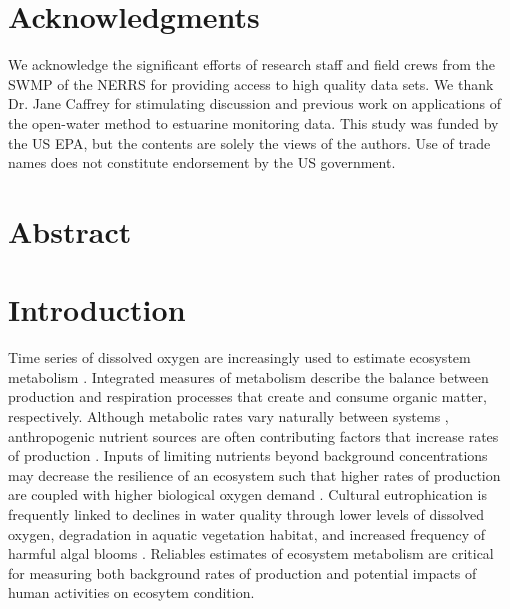 \documentclass[letterpaper,12pt,oneside]{article}\usepackage[]{graphicx}\usepackage[]{color}
\begin{document}
\raggedbottom
\linenumbers
\raggedright
{}
\setlength{\parindent}{0.5in}
\renewcommand\refname{References \vspace{12pt}}



\section{Acknowledgments}

We acknowledge the significant efforts of research staff and field crews from the \acl{SWMP} of the \acl{NERRS} for providing access to high quality data sets.  We thank Dr. Jane Caffrey for stimulating discussion and previous work on applications of the open-water method to estuarine monitoring data. This study was funded by the US \acl{EPA}, but the contents are solely the views of the authors.  Use of trade names does not constitute endorsement by the US government.

\newpage
\section{Abstract}


\acresetall
\clearpage

\section{Introduction} \label{intro}

Time series of dissolved oxygen are increasingly used to estimate ecosystem metabolism \citep{Kemp12,Needoba12}.  Integrated measures of metabolism describe the balance between production and respiration processes that create and consume organic matter, respectively.  Although metabolic rates vary naturally between systems \citep{Ziegler98,Caffrey04,Russell07}, anthropogenic nutrient sources are often contributing factors that increase rates of production \citep{Diaz08}.  Inputs of limiting nutrients beyond background concentrations may decrease the resilience of an ecosystem such that higher rates of production are coupled with higher biological oxygen demand \citep{Yin04,Kemp09}.  Cultural eutrophication is frequently linked to declines in water quality through lower levels of dissolved oxygen, degradation in aquatic vegetation habitat, and increased frequency of harmful algal blooms \citep{Cloern96,Short96,Rabalais02}.  Reliables estimates of ecosystem metabolism are critical for measuring both background rates of production and potential impacts of human activities on ecosytem condition.     
\end{document}
